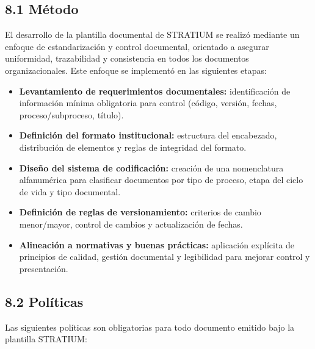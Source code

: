\documentclass{encabezado}
\begin{document}
\subsection*{8.1 Método}

El desarrollo de la plantilla documental de STRATIUM se realizó mediante un enfoque de estandarización y control documental, orientado a asegurar uniformidad, trazabilidad y consistencia en todos los documentos organizacionales. Este enfoque se implementó en las siguientes etapas:

\begin{itemize}
    \item \textbf{Levantamiento de requerimientos documentales:} identificación de información mínima obligatoria para control (código, versión, fechas, proceso/subproceso, título).
    \item \textbf{Definición del formato institucional:} estructura del encabezado, distribución de elementos y reglas de integridad del formato.
    \item \textbf{Diseño del sistema de codificación:} creación de una nomenclatura alfanumérica para clasificar documentos por tipo de proceso, etapa del ciclo de vida y tipo documental.
    \item \textbf{Definición de reglas de versionamiento:} criterios de cambio menor/mayor, control de cambios y actualización de fechas.
    \item \textbf{Alineación a normativas y buenas prácticas:} aplicación explícita de principios de calidad, gestión documental y legibilidad para mejorar control y presentación.
\end{itemize}

\subsection*{8.2 Políticas}

Las siguientes políticas son obligatorias para todo documento emitido bajo la plantilla STRATIUM:
\end{document}

